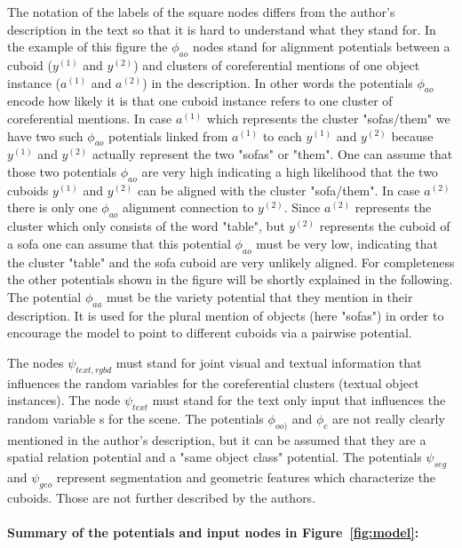 \documentclass{utue} %
\begin{document}
The notation of the labels of the square nodes differs from the author's description in the text so that it is hard to understand what they stand for. In the example of this figure the $\phi_{ao}$ nodes stand for alignment potentials between a cuboid ($y^{(1)}$ and $y^{(2)}$) and clusters of coreferential mentions of one object instance ($a^{(1)}$ and $a^{(2)}$) in the description. In other words the potentials $\phi_{ao}$ encode how likely it is that one cuboid instance refers to one cluster of coreferential mentions. In case $a^{(1)}$ which represents the cluster "sofas/them" we have two such $\phi_{ao}$ potentials linked from $a^{(1)}$ to each $y^{(1)}$ and $y^{(2)}$ because $y^{(1)}$ and $y^{(2)}$ actually represent the two "sofas" or "them". One can assume that those two potentials $\phi_{ao}$ are very high indicating a high likelihood that the two cuboids $y^{(1)}$ and $y^{(2)}$ can be aligned with the cluster "sofa/them". In case $a^{(2)}$ there is only one $\phi_{ao}$ alignment connection to $y^{(2)}$. Since $a^{(2)}$ represents the cluster which only consists of the word "table", but $y^{(2)}$ represents the cuboid of a sofa one can assume that this potential $\phi_{ao}$ must be very low, indicating that the cluster "table" and the sofa cuboid are very unlikely aligned.
For completeness the other potentials shown in the figure will be shortly explained in the following. The potential $\phi_{aa}$ must be the variety potential that they mention in their description. It is used for the plural mention of objects (here "sofas") in order to encourage the model to point to different cuboids via a pairwise potential. 

The nodes $\psi_{text, rgbd}$ must stand for joint visual and textual information that influences the random variables for the coreferential clusters (textual object instances). The node $\psi_{text}$ must stand for the text only input that influences the random variable s for the scene. The potentials $\phi_{oo)}$ and $\phi_{c}$ are not really clearly mentioned in the author's description, but it can be assumed that they are a spatial relation potential and a "same object class" potential. The potentials $\psi_{seg}$ and $\psi_{geo}$ represent segmentation and geometric features which characterize the cuboids. Those are not further described by the authors.

\newpage

\paragraph{Summary of the potentials and input nodes in Figure~\ref{fig:model}:}
\end{document}
